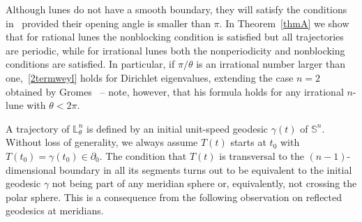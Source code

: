 \documentclass[11pt,a4paper,times]{amsart}
\theoremstyle{plain}
\theoremstyle{definition}
\numberwithin{equation}{section}
\newcommand{\Se}{\mathbb{S}}
\newcommand{\lune}[2]{\mathbb{L}^{#1}_{#2}}
\begin{document}
 Although lunes do not have a smooth boundary, they will satisfy the conditions in~\cite{va} provided their opening
 angle is smaller than $\pi$. In Theorem~\ref{thmA} we show that for rational lunes the nonblocking condition is satisfied
 but all trajectories are periodic, while {for irrational lunes } both the  nonperiodicity and nonblocking conditions are satisfied. In particular, if $\pi/\theta$ is an irrational number larger than one,~\eqref{2termweyl} holds for Dirichlet eigenvalues, extending the case $n=2$ obtained by Gromes~\cite{gr} -- note, however, that his formula  holds for any irrational $n$-lune with $\theta<2\pi$.

 A trajectory  of $\lune{n}{\theta}$ is defined by an initial unit-speed geodesic $\gamma(t)$ of $\Se^n$. Without loss of generality, we always assume
 $T(t)$ starts at $t_0$ with $T(t_0)=\gamma(t_0)\in \partial_0$. The condition that $T(t)$ is transversal to the $(n-1)$-dimensional boundary in all its
 segments turns out to be equivalent  to the  {initial geodesic  $\gamma$  not being  part of any meridian sphere or, equivalently, not crossing}
 the polar sphere.
 This is a consequence from the following observation on reflected geodesics at meridians.
  
\end{document}
